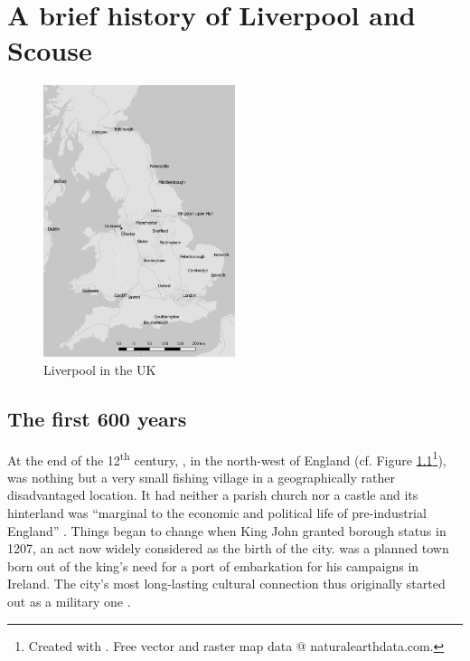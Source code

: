 \chapter{A brief history of Liverpool and Scouse}\label{ch.hist}

	\begin{figure}[h]
		\centering
 		\includegraphics[width=0.5\textwidth]{figures/Map-England.png}
		\caption{Liverpool in the UK}
		\label{fig.ex}
	\end{figure}

	\section{The first 600 years}\label{sec.hist.early}

At the end of the 12\textsuperscript{th} century, , in the north-west of England (cf. Figure \ref{fig.ex}\footnote{Created with \cite{QGIS2016}. Free vector and raster map data @ naturalearthdata.com.}), was nothing but a very small fishing village in a geographically rather disadvantaged location.
It had neither a parish church nor a castle and its hinterland was ``marginal to the economic and political life of pre-industrial England'' \citep[59]{kermodeetal2006}.
Things began to change when King John granted  borough status in 1207, an act now widely considered as the birth of the city. 
 was a planned town born out of the king's need for a port of embarkation for his campaigns in Ireland.
The city's most long-lasting cultural connection thus originally started out as a military one \citeyearpar[cf.][59--63]{kermodeetal2006}.

